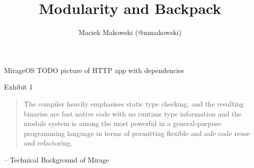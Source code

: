 \documentclass{beamer}
\begin{document}
\title{Modularity and Backpack}
\author{Maciek Makowski (@mmakowski)}

\frame{\titlepage}

\begin{frame}{MirageOS}
TODO picture of HTTP app with dependencies
\end{frame}

\begin{frame}{Exhibit 1}
\begin{quote}
The compiler heavily emphasises static type checking, and the resulting binaries are fast native code with no runtime type information and the module system is among the most powerful in a general-purpose programming language in terms of permitting flexible and safe code reuse and refactoring.
\end{quote}
-- Technical Background of Mirage
\end{frame}
\end{document}
